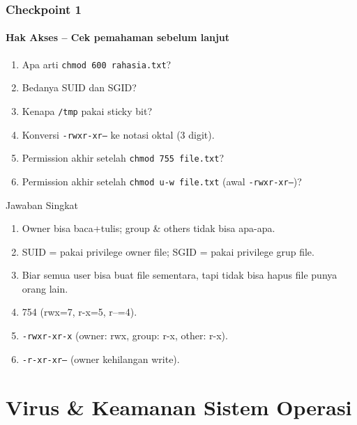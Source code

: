 \documentclass[t,aspectratio=169,xcolor=dvipsnames]{beamer}
\begin{document}
\begin{frame}[shrink=3]
    \frametitle{Checkpoint 1}
    \framesubtitle{Hak Akses -- Cek pemahaman sebelum lanjut}
    \small
    \begin{enumerate}
        \item Apa arti \texttt{chmod 600 rahasia.txt}?
        \item Bedanya SUID dan SGID?
        \item Kenapa \texttt{/tmp} pakai sticky bit?
        \item Konversi \texttt{-rwxr-xr--} ke notasi oktal (3 digit).
        \item Permission akhir setelah \texttt{chmod 755 file.txt}?
        \item Permission akhir setelah \texttt{chmod u-w file.txt} (awal \texttt{-rwxr-xr--})?
    \end{enumerate}
    \vspace{0.2cm}
    \begin{block}{Jawaban Singkat}
        \footnotesize
        \begin{enumerate}
            \item Owner bisa baca+tulis; group \& others tidak bisa apa-apa.
            \item SUID = pakai privilege owner file; SGID = pakai privilege grup file.
            \item Biar semua user bisa buat file sementara, tapi tidak bisa hapus file punya orang lain.
            \item 754 (rwx=7, r-x=5, r--=4).
            \item \texttt{-rwxr-xr-x} (owner: rwx, group: r-x, other: r-x).
            \item \texttt{-r-xr-xr--} (owner kehilangan write).
        \end{enumerate}
    \end{block}
\end{frame}

\section{Virus \& Keamanan Sistem Operasi}
\end{document}

